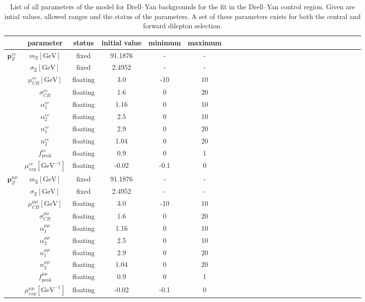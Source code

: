 \begin{table}[htbp]
\begin{center}
 \renewcommand{\arraystretch}{1.3}
 \caption{List of all parameters of the model for Drell--Yan backgrounds for the fit in the Drell--Yan control region. Given are intial values, allowed ranges and the status of the parameters. A set of these parameters exists for both the central and forward dilepton selection.\label{tab:Fit_Par_Overview_Z}}
\begin{tabular}{l|c|c|c|c|ccccccccccccccccccccc}
& parameter & status & initial value & minimum & maximum \\ \hline
\multirow{10}{*}{$\mathbf{p}_{Z}^{ee}$} & $m_{\mathrm{Z}} [\mathrm{GeV}]$ & fixed & 91.1876 & - & - \\ 
& $\sigma_{\mathrm{Z}}  [\mathrm{GeV}]$ & fixed & 2.4952 & - & - \\
& $\mu_{CB}^{ee} [\mathrm{GeV}]$ & floating & 3.0 & -10 & 10 \\ 
& $\sigma_{CB}^{ee}$ & floating & 1.6 & 0 & 20 \\
& $\alpha_{1}^{ee}$ & floating & 1.16 & 0 & 10 \\
& $\alpha_{2}^{ee}$ & floating & 2.5 & 0 & 10 \\
& $n_{1}^{ee}$ & floating & 2.9 & 0 & 20 \\
& $n_{2}^{ee}$ & floating & 1.04 & 0 & 20 \\
& $f_\text{peak}^{ee}$ & floating & 0.9 & 0 & 1 \\
& $\mu_{exp}^{ee} [\mathrm{GeV}^{-1}]$ & floating & -0.02& -0.1 & 0 \\ \hline
\multirow{10}{*}{$\mathbf{p}_{Z}^{\mu\mu}$} & $m_{\mathrm{Z}} [\mathrm{GeV}]$ & fixed & 91.1876 & - & - \\ 
& $\sigma_{\mathrm{Z}} [\mathrm{GeV}]$  & fixed & 2.4952 & - & - \\
& $\mu_{CB}^{\mu\mu} [\mathrm{GeV}]$ & floating & 3.0 & -10 & 10 \\
&  $\sigma_{CB}^{\mu\mu}$ & floating & 1.6 & 0 & 20 \\
&  $\alpha_{1}^{\mu\mu}$ & floating & 1.16 & 0 & 10 \\
&  $\alpha_{2}^{\mu\mu}$ & floating & 2.5 & 0 & 10 \\
&  $n_{1}^{\mu\mu}$ & floating & 2.9 & 0 & 20 \\
&  $n_{2}^{\mu\mu}$ & floating & 1.04 & 0 & 20 \\
&  $f_\text{peak}^{\mu\mu}$ & floating & 0.9 & 0 & 1 \\
&  $\mu_{exp}^{\mu\mu} [\mathrm{GeV}^{-1}]$& floating & -0.02 & -0.1 & 0 \\ 
\end{tabular}

\end{center}
\end{table}


